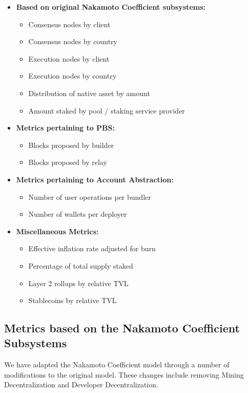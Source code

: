 \documentclass[conference]{IEEEtran}
\begin{document}
\begin{itemize}
   \item \textbf{Based on original Nakamoto Coefficient subsystems:}
   \begin{itemize}
     \item Consensus nodes by client
     \item Consensus nodes by country
     \item Execution nodes by client
     \item Execution nodes by country
     \item Distribution of native asset by amount
     \item Amount staked by pool / staking service provider
   \end{itemize}
   \item \textbf{Metrics pertaining to PBS:}
   \begin{itemize}
       \item Blocks proposed by builder
       \item Blocks proposed by relay
   \end{itemize}
   \item \textbf{Metrics pertaining to Account Abstraction:}
   \begin{itemize}
       \item Number of user operations per bundler
       \item Number of wallets per deployer
   \end{itemize}
   \item \textbf{Miscellaneous Metrics:}
   \begin{itemize}
       \item Effective inflation rate adjusted for burn
       \item Percentage of total supply staked
       \item Layer 2 rollups by relative TVL
       \item Stablecoins by relative TVL
   \end{itemize}
 \end{itemize}

 \vspace{4pt}

\subsection{Metrics based on the Nakamoto Coefficient Subsystems}

We have adapted the Nakamoto Coefficient model through a number of modifications to the original model.  These changes include removing Mining Decentralization and Developer Decentralization. 
\end{document}
